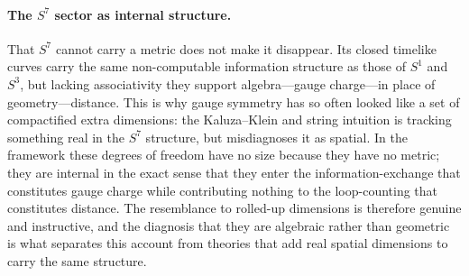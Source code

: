 \paragraph{The $S^{7}$ sector as internal structure.}
That $S^{7}$ cannot carry a metric does not make it disappear. Its closed
timelike curves carry the same non-computable information structure as those of
$S^{1}$ and $S^{3}$, but lacking associativity they support algebra---gauge
charge---in place of geometry---distance. This is why gauge symmetry has so often
looked like a set of compactified extra dimensions: the Kaluza--Klein and string
intuition is tracking something real in the $S^{7}$ structure, but misdiagnoses
it as spatial. In the framework these degrees of freedom have no size because
they have no metric; they are internal in the exact sense that they enter the
information-exchange that constitutes gauge charge while contributing nothing to
the loop-counting that constitutes distance. The resemblance to rolled-up
dimensions is therefore genuine and instructive, and the diagnosis that they are
algebraic rather than geometric is what separates this account from theories that
add real spatial dimensions to carry the same structure.

